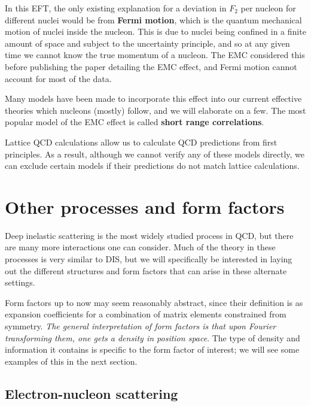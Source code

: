 \documentclass[11pt, oneside]{article}   	%
\theoremstyle{definition}
\begin{document}
In this EFT, the only existing explanation for a deviation in $F_2$ per nucleon for different nuclei would be from \textbf{Fermi motion}, which 
is the quantum mechanical motion of nuclei inside the nucleon. This is due to nuclei being confined in a finite amount of space and subject to 
the uncertainty principle, and so at any given time we cannot know the true momentum of a nucleon. The EMC considered this before 
publishing the paper detailing the EMC effect, and Fermi motion cannot account for most of the data.

Many models have been made to incorporate this effect into our current effective theories which nucleons (mostly) follow, and we will 
elaborate on a few. The most popular model of the EMC effect is called \textbf{short range correlations}. 

Lattice QCD calculations allow us to calculate QCD predictions from first principles. As a result, although we cannot verify any of these 
models directly, we can exclude certain models if their predictions do not match lattice calculations. 

\newpage
\section{Other processes and form factors}

Deep inelastic scattering is the most widely studied process in QCD, but there are many more interactions one can consider. 
Much of the theory in these processes is very similar to DIS, but we will specifically be interested in laying out the different structures 
and form factors that can arise in these alternate settings. 

Form factors up to now may seem reasonably abstract, since their definition is as expansion coefficients for a combination of matrix 
elements constrained from symmetry. \textit{The general interpretation of form factors is that upon Fourier transforming them, one gets a 
density in position space}. The type of density and information it contains is specific to the form factor of interest; we will see some examples 
of this in the next section.

\subsection{Electron-nucleon scattering}
\end{document}
